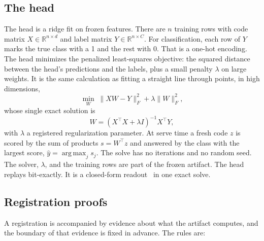 \documentclass[11pt]{article}
\DeclareMathOperator{\argmax}{arg\,max}
\begin{document}
\subsection{The head}

The head is a ridge fit on frozen features. There are $n$
training rows with code matrix $X \in \mathbb{R}^{n \times d}$
and label matrix $Y \in \mathbb{R}^{n \times C}$. For
classification, each row of $Y$ marks the true class with a 1
and the rest with 0. That is a one-hot encoding. The head
minimizes the penalized least-squares objective: the squared
distance between the head's predictions and the labels, plus a
small penalty $\lambda$ on large weights. It is the same calculation
as fitting a straight line through points, in high dimensions,
\begin{equation}
    \min_{W} \; \| XW - Y \|_F^2 + \lambda \| W \|_F^2,
\end{equation}
whose single exact solution is
\begin{equation}
    W = (X^\top X + \lambda I)^{-1} X^\top Y,
\end{equation}
with $\lambda$ a registered regularization parameter. At serve
time a fresh code $z$ is scored by the sum of products
$s = W^\top z$ and answered by the class with the largest
score, $\hat y = \argmax_j s_j$. The
solve has no iterations and no random seed. The solver,
$\lambda$, and the training rows are part of the frozen
artifact. The head replays bit-exactly. It is a closed-form
readout~\cite{belrose2023} in one exact solve.

\subsection{Registration proofs}

A registration is accompanied by evidence about what the artifact
computes, and the boundary of that evidence is fixed in advance.
The rules are:
\end{document}
